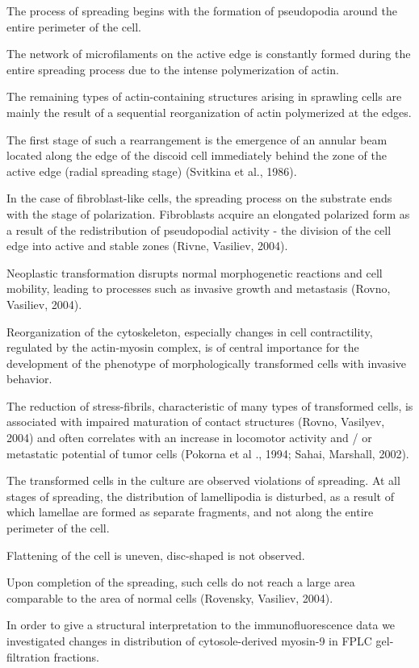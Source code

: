 \documentclass[english,authoryear]{elsarticle}
\begin{document}
The process of spreading begins with the formation of pseudopodia around the entire perimeter of the cell.


The network of microfilaments on the active edge is constantly formed during the entire spreading process due to the intense polymerization of actin.


The remaining types of actin-containing structures arising in sprawling cells are mainly the result of a sequential reorganization of actin polymerized at the edges.

The first stage of such a rearrangement is the emergence of an annular beam located along the edge of the discoid cell immediately behind the zone of the active edge (radial spreading stage) (Svitkina et al., 1986).


In the case of fibroblast-like cells, the spreading process on the substrate ends with the stage of polarization. Fibroblasts acquire an elongated polarized form as a result of the redistribution of pseudopodial activity - the division of the cell edge into active and stable zones (Rivne, Vasiliev, 2004).

Neoplastic transformation disrupts normal morphogenetic reactions and cell mobility, leading to processes such as invasive growth and metastasis (Rovno, Vasiliev, 2004).

Reorganization of the cytoskeleton, especially changes in cell contractility, regulated by the actin-myosin complex, is of central importance for the development of the phenotype of morphologically transformed cells with invasive behavior.

The reduction of stress-fibrils, characteristic of many types of transformed cells, is associated with impaired maturation of contact structures (Rovno, Vasilyev, 2004) and often correlates with an increase in locomotor activity and / or metastatic potential of tumor cells (Pokorna et al ., 1994; Sahai, Marshall, 2002).

The transformed cells in the culture are observed violations of spreading.
At all stages of spreading, the distribution of lamellipodia is disturbed, as a result of which lamellae are formed as separate fragments, and not along the entire perimeter of the cell.

Flattening of the cell is uneven, disc-shaped is not observed.


Upon completion of the spreading, such cells do not reach a large area comparable to the area of normal cells (Rovensky, Vasiliev, 2004).


In order to give a structural interpretation to the immunofluorescence data we investigated changes in distribution of cytosole-derived myosin-9 in FPLC gel-filtration fractions.
\end{document}
